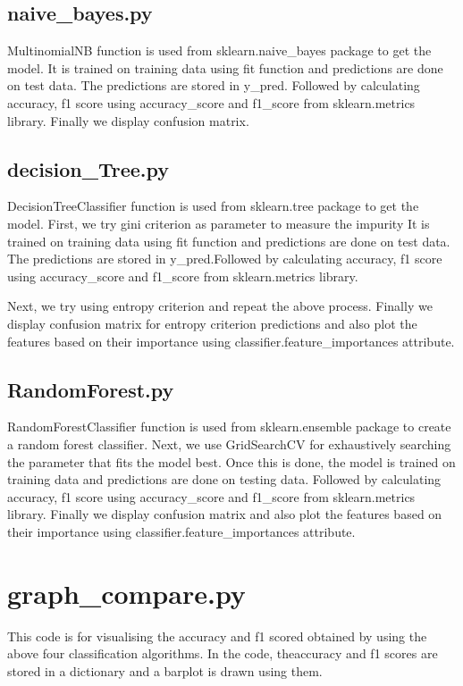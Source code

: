 \documentclass{article}
\begin{document}
\subsection{naive\_bayes.py}

MultinomialNB function is used from sklearn.naive\_bayes package to get the model. It is trained on training data using fit function and predictions are done on test data. The predictions are stored in y\_pred.
Followed by calculating accuracy, f1 score using accuracy\_score and f1\_score from sklearn.metrics library. Finally we display confusion matrix.

\subsection{decision\_Tree.py}
 DecisionTreeClassifier function is used from sklearn.tree package to get the model.
 First, we try gini criterion as parameter to measure the impurity
 It is trained on training data using fit function and predictions are done on test data. The predictions are stored in y\_pred.Followed by calculating accuracy, f1 score using accuracy\_score and f1\_score from sklearn.metrics library.

Next, we try using entropy criterion and repeat the above process.
Finally we display confusion matrix for entropy criterion predictions and also plot the features based on their importance using classifier.feature\_importances attribute.

\subsection{RandomForest.py}

RandomForestClassifier function is used from sklearn.ensemble package to create a random forest classifier. Next, we use GridSearchCV for exhaustively searching the parameter that fits the model best. Once this is done, the model is trained on training data and predictions are done on testing data. Followed by calculating accuracy, f1 score using accuracy\_score and f1\_score from sklearn.metrics library. Finally we display confusion matrix and also plot the features based on their importance using classifier.feature\_importances attribute.

\section{graph\_compare.py}
This code is for visualising the accuracy and f1 scored obtained by using the above four classification algorithms. In the code, theaccuracy and f1 scores are stored in a dictionary and a barplot is drawn using them.
\end{document}

